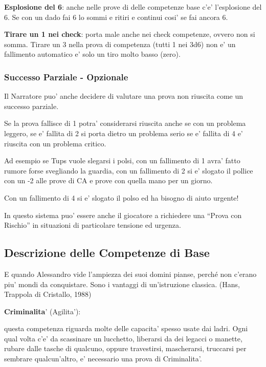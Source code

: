 \documentclass[a4paper,11pt,twoside,openany]{dndbook}
\begin{document}
\textbf{Esplosione del 6}: anche nelle prove di delle competenze base c'e' l'esplosione del 6. Se con un dado fai 6 lo sommi e ritiri e continui cosi' se fai ancora 6.

\textbf{Tirare un 1 nei check}: porta male anche nei check competenze, ovvero non si somma. Tirare un 3 nella prova di competenza (tutti 1 nei 3d6) non e' un fallimento automatico e' solo un tiro molto basso (zero).

\subsubsection{Successo Parziale - Opzionale}

Il Narratore puo' anche decidere di valutare una prova non riuscita come un successo parziale.

Se la prova fallisce di 1 potra' considerarsi riuscita anche se con un problema leggero, se e' fallita di 2 si porta dietro un problema serio se e' fallita di 4 e' riuscita con un problema critico.

Ad esempio se Tups vuole slegarsi i polsi, con un fallimento di 1 avra' fatto rumore forse svegliando la guardia, con un fallimento di 2 si e' slogato il pollice con un -2 alle prove di CA e prove con quella mano per un giorno.

Con un fallimento di 4 si e' slogato il polso ed ha bisogno di aiuto urgente!

In questo sistema puo' essere anche il giocatore a richiedere una ``Prova con Rischio'' in situazioni di particolare tensione ed urgenza.

\pagebreak

\subsection{Descrizione delle Competenze di Base}

\label{descrizione-delle-competenze-di-base}
\begin{quotebox}
E quando Alessandro vide l'ampiezza dei suoi domini pianse, perché non c'erano piu' mondi da conquistare. Sono i vantaggi di un'istruzione classica. (Hans, Trappola di Cristallo, 1988)
\end{quotebox}

\textbf{Criminalita}' (Agilita'):

questa competenza riguarda molte delle capacita' spesso usate dai ladri. Ogni qual volta c'e' da scassinare un lucchetto, liberarsi da dei legacci o manette, rubare dalle tasche di qualcuno, oppure travestirsi, mascherarsi, truccarsi per sembrare qualcun'altro, e' necessario una prova di Criminalita'.
\end{document}

